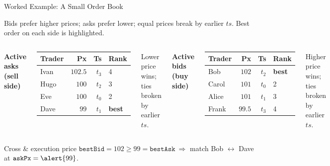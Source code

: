 \begin{frame}{Worked Example: A Small Order Book}

Bids prefer higher prices; asks prefer lower; equal prices break by earlier $ts$. \alert{Best} order on each side is highlighted.

\begin{columns}[T]
\textbf{Active asks (sell side)}
\vspace{1mm}
\begin{center}
\renewcommand{\arraystretch}{1.15}
\begin{tabular}{lrrl}
\toprule
\textbf{Trader} & \textbf{Px} & \textbf{Ts} & \textbf{Rank} \\
\midrule
Ivan & $102.5$ & $t_3$ & 4 \\
Hugo & $100$   & $t_2$ & 3 \\
Eve  & $100$   & $t_0$ & 2 \\
\rowcolor{nus-orange!20} Dave & $99$ & $t_1$ & \textbf{best} \\
\bottomrule
\end{tabular}
\end{center}
\vspace{1mm}
{\small Lower price wins; ties broken by earlier $ts$.}

\textbf{Active bids (buy side)}
\vspace{1mm}
\begin{center}
\renewcommand{\arraystretch}{1.15}
\begin{tabular}{lrrl}
\toprule
\textbf{Trader} & \textbf{Px} & \textbf{Ts} & \textbf{Rank} \\
\midrule
\rowcolor{nus-orange!20} Bob   & $102$  & $t_2$ & \textbf{best} \\
Carol & $101$  & $t_0$ & 2 \\
Alice & $101$  & $t_1$ & 3 \\
Frank & $99.5$ & $t_3$ & 4 \\
\bottomrule
\end{tabular}
\end{center}
\vspace{1mm}
{\small Higher price wins; ties broken by earlier $ts$.}
\end{columns}

\vspace{2mm}

\begin{block}{Cross \& execution price}
$\texttt{bestBid}=102 \geq 99=\texttt{bestAsk}\ \Rightarrow$ match \alert{Bob $\leftrightarrow$ Dave} at $\texttt{askPx}=\alert{99}$.
\end{block}

\end{frame}
